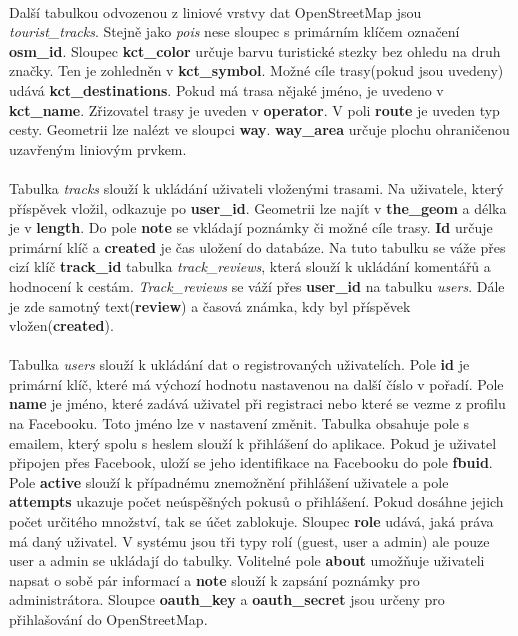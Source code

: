 \documentclass[11pt,a4paper,titlepage,oneside]{book}
\begin{document}
                        \paragraph{} Další tabulkou odvozenou z liniové vrstvy dat OpenStreetMap jsou \textit{tourist\_tracks}. Stejně jako \textit{pois} nese sloupec s primárním klíčem označení \textbf{osm\_id}. Sloupec \textbf{kct\_color} určuje barvu turistické stezky bez ohledu na druh značky. Ten je zohledněn v \textbf{kct\_symbol}. Možné cíle trasy(pokud jsou uvedeny) udává \textbf{kct\_destinations}. Pokud má trasa nějaké jméno, je uvedeno v \textbf{kct\_name}. Zřizovatel trasy je uveden v \textbf{operator}. V poli \textbf{route} je uveden typ cesty. Geometrii lze nalézt ve sloupci \textbf{way}. \textbf{way\_area} určuje plochu ohraničenou uzavřeným liniovým prvkem.
			\paragraph{} Tabulka \textit{tracks} slouží k ukládání uživateli vloženými trasami. Na uživatele, který příspěvek vložil, odkazuje po \textbf{user\_id}. Geometrii lze najít v \textbf{the\_geom} a délka je v \textbf{length}. Do pole \textbf{note} se vkládají poznámky či možné cíle trasy. \textbf{Id} určuje primární klíč a \textbf{created} je čas uložení do databáze. Na tuto tabulku se váže přes cizí klíč \textbf{track\_id} tabulka \textit{track\_reviews}, která slouží k ukládání komentářů a hodnocení k cestám. \textit{Track\_reviews} se váží přes \textbf{user\_id} na tabulku \textit{users}. Dále je zde samotný text(\textbf{review}) a časová známka, kdy byl příspěvek vložen(\textbf{created}).
			\paragraph{}Tabulka \textit{users} slouží k ukládání dat o registrovaných uživatelích. Pole \textbf{id} je primární klíč, které má výchozí hodnotu nastavenou na další číslo v pořadí. Pole \textbf{name} je jméno, které zadává uživatel při registraci nebo které se vezme z profilu na Facebooku. Toto jméno lze v nastavení změnit. Tabulka obsahuje pole s emailem, který spolu s heslem slouží k přihlášení do aplikace. Pokud je uživatel připojen přes Facebook, uloží se jeho identifikace na Facebooku do pole \textbf{fbuid}. Pole \textbf{active} slouží k případnému znemožnění přihlášení uživatele a pole \textbf{attempts} ukazuje počet neúspěšných pokusů o přihlášení. Pokud dosáhne jejich počet určitého množství, tak se účet zablokuje. Sloupec \textbf{role} udává, jaká práva má daný uživatel. V systému jsou tři typy rolí (guest, user a admin) ale pouze user a admin se ukládají do tabulky. Volitelné pole \textbf{about} umožňuje uživateli napsat o sobě pár informací a \textbf{note} slouží k zapsání poznámky pro administrátora. Sloupce \textbf{oauth\_key} a \textbf{oauth\_secret} jsou určeny pro přihlašování do OpenStreetMap.
\end{document}
